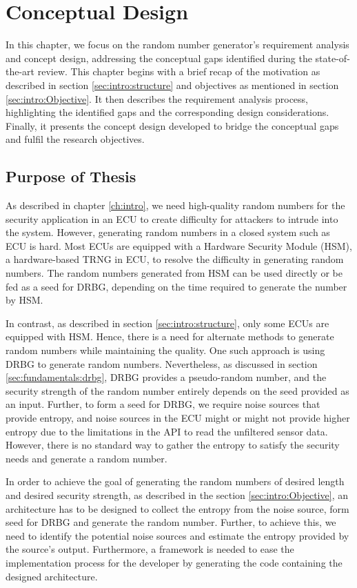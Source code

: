 \chapter{Conceptual Design}
\label{ch:CD}

In this chapter, we focus on the random number generator's requirement analysis and concept design, addressing the conceptual gaps identified during the state-of-the-art review. This chapter begins with a brief recap of the motivation as described in section \ref{sec:intro:structure} and objectives as mentioned in section \ref{sec:intro:Objective}. It then describes the requirement analysis process, highlighting the identified gaps and the corresponding design considerations. Finally, it presents the concept design developed to bridge the conceptual gaps and fulfil the research objectives.

%
%
\section{Purpose of Thesis}
\label{sec:CD:PoT}
As described in chapter \ref{ch:intro}, we need high-quality random numbers for the security application in an ECU to create difficulty for attackers to intrude into the system. However, generating random numbers in a closed system such as ECU is hard. Most ECUs are equipped with a Hardware Security Module (HSM), a hardware-based TRNG in ECU, to resolve the difficulty in generating random numbers. The random numbers generated from HSM can be used directly or be fed as a seed for DRBG, depending on the time required to generate the number by HSM.

In contrast, as described in section \ref{sec:intro:structure}, only some ECUs are equipped with HSM. Hence, there is a need for alternate methods to generate random numbers while maintaining the quality. One such approach is using DRBG to generate random numbers. Nevertheless, as discussed in section \ref{sec:fundamentals:drbg}, DRBG provides a pseudo-random number, and the security strength of the random number entirely depends on the seed provided as an input. Further, to form a seed for DRBG, we require noise sources that provide entropy, and noise sources in the ECU might or might not provide higher entropy due to the limitations in the API to read the unfiltered sensor data. However, there is no standard way to gather the entropy to satisfy the security needs and generate a random number.

In order to achieve the goal of generating the random numbers of desired length and desired security strength, as described in the section \ref{sec:intro:Objective}, an architecture has to be designed to collect the entropy from the noise source, form seed for DRBG and generate the random number. Further, to achieve this, we need to identify the potential noise sources and estimate the entropy provided by the source's output. Furthermore, a framework is needed to ease the implementation process for the developer by generating the code containing the designed architecture.



